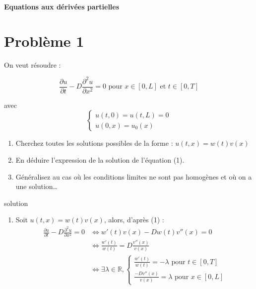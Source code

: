 \documentclass[12pt,a4paper]{article}
\begin{document}
\begin{center}
    \textbf{Equations aux dérivées partielles}\\
\end{center}

\section{Problème 1}
On veut résoudre :

\begin{equation}
    \frac{\partial u}{\partial t} - D \frac{\partial^2 u}{\partial x^2} = 0
    \text{ pour } x \in [0, L] \text{ et } t \in [0, T]
\end{equation} 

avec 
$$
\begin{cases}
    u(t, 0) = u(t, L) = 0\\
    u(0, x) = u_0(x)
\end{cases}
$$

\begin{enumerate}
    \item Cherchez toutes les solutions possibles de la forme :
    $u(t, x) = w(t)v(x)$
    
    \item En déduire l'expression de la solution de l'équation (1).
    
    \item Généralisez au cas où les conditions limites ne sont pas homogènes et où on a une solution\dots

\end{enumerate}

\color{blue}
solution

\begin{enumerate}
    \item Soit $u(t, x) = w(t)v(x)$, alors, d'après (1) :
    \begin{align*}
        \frac{\partial u}{\partial t} - D \frac{\partial^2 u}{\partial x^2} = 0
        &\Leftrightarrow 
        w'(t)v(x) - D w(t) v''(x) = 0\\
        &\Leftrightarrow
        \frac{w'(t)}{w(t)} = D \frac{v''(x)}{v(x)}\\
        &\Leftrightarrow
        \exists \lambda \in \mathbb{R},
        \begin{cases}
            \frac{w'(t)}{w(t)} = -\lambda \text{ pour } t \in [0, T]\\
            \frac{-D v''(x)}{v(x)} = \lambda \text{ pour } x \in [0, L]
        \end{cases}
    \end{align*}
    
\end{enumerate}
\end{document}
